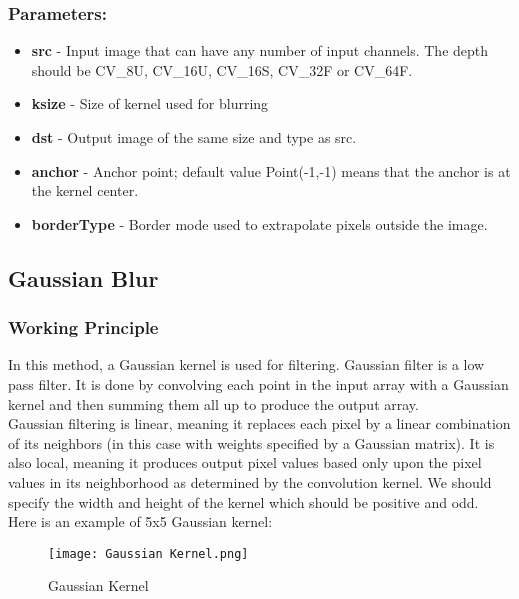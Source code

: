 \documentclass[]{article}
\providecommand{\tightlist}{%
  \setlength{\itemsep}{0pt}\setlength{\parskip}{0pt}}
\begin{document}
\subsubsection{Parameters:}\label{parameters}

\begin{itemize}
\tightlist
\item
  \textbf{src} - Input image that can have any number of input channels.
  The depth should be CV\_8U, CV\_16U, CV\_16S, CV\_32F or CV\_64F.\\
\item
  \textbf{ksize} - Size of kernel used for blurring\\
\item
  \textbf{dst} - Output image of the same size and type as src.\\
\item
  \textbf{anchor} - Anchor point; default value Point(-1,-1) means that
  the anchor is at the kernel center.
\item
  \textbf{borderType} - Border mode used to extrapolate pixels outside
  the image.
\end{itemize}

\subsection{Gaussian Blur}\label{gaussian-blur}

\subsubsection{Working Principle}\label{working-principle-1}

In this method, a Gaussian kernel is used for filtering. Gaussian filter
is a low pass filter. It is done by convolving each point in the input
array with a Gaussian kernel and then summing them all up to produce the
output array.\\
Gaussian filtering is linear, meaning it replaces each pixel by a linear
combination of its neighbors (in this case with weights specified by a
Gaussian matrix). It is also local, meaning it produces output pixel
values based only upon the pixel values in its neighborhood as
determined by the convolution kernel. We should specify the width and
height of the kernel which should be positive and odd.\\
Here is an example of 5x5 Gaussian kernel:

\begin{figure}[htbp]
	\centering
    \texttt{[image: Gaussian Kernel.png]}
    \caption{Gaussian Kernel}
\end{figure}
\end{document}

